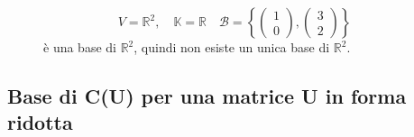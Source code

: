 \documentclass[a4paper]{article}
\theoremstyle{break}
\theoremstyle{break}
\theoremstyle{break}
\theoremstyle{break}
\begin{document}
\begin{figure}[H]
  \begin{example}
    \[
      V = \mathbb{R}^2, \quad \mathbb{K} = \mathbb{R} \quad \mathcal{B} = \left\{ \begin{pmatrix} 
          1\\0
      \end{pmatrix},
      \begin{pmatrix} 
        3\\2
      \end{pmatrix}
    \right\}
    \] 
    è una base di \( \mathbb{R}^2 \), quindi non esiste un unica base di \( \mathbb{R}^2 \).
  \end{example}
\end{figure}

\subsection{Base di C(U) per una matrice U in forma ridotta }
\label{6.6}
\end{document}
